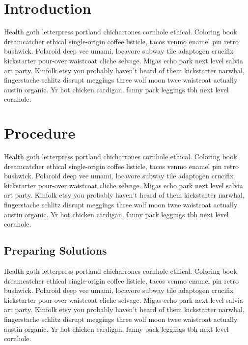 \documentclass[letterpaper,titlepage,\myfontsize]{article}
\title{\vspace*{-1.51cm}\mydoctitle\vspace*{-.5cm}}
\author{\normalsize\myname}
\date{\vspace*{-.3cm}\normalsize\today\vspace*{-.2cm}}
\begin{document}
\maketitle

\section*{Introduction}

Health goth letterpress portland chicharrones cornhole ethical. Coloring book dreamcatcher ethical single-origin coffee listicle, tacos venmo enamel pin retro bushwick. Polaroid deep vee umami, locavore subway tile adaptogen crucifix kickstarter pour-over waistcoat cliche selvage. Migas echo park next level salvia art party. Kinfolk etsy you probably haven't heard of them kickstarter narwhal, fingerstache schlitz disrupt meggings three wolf moon twee waistcoat actually austin organic. Yr hot chicken cardigan, fanny pack leggings tbh next level cornhole.

\section*{Procedure}

Health goth letterpress portland chicharrones cornhole ethical. Coloring book dreamcatcher ethical single-origin coffee listicle, tacos venmo enamel pin retro bushwick. Polaroid deep vee umami, locavore subway tile adaptogen crucifix kickstarter pour-over waistcoat cliche selvage. Migas echo park next level salvia art party. Kinfolk etsy you probably haven't heard of them kickstarter narwhal, fingerstache schlitz disrupt meggings three wolf moon twee waistcoat actually austin organic. Yr hot chicken cardigan, fanny pack leggings tbh next level cornhole.

\subsection*{Preparing Solutions}

Health goth letterpress portland chicharrones cornhole ethical. Coloring book dreamcatcher ethical single-origin coffee listicle, tacos venmo enamel pin retro bushwick. Polaroid deep vee umami, locavore subway tile adaptogen crucifix kickstarter pour-over waistcoat cliche selvage. Migas echo park next level salvia art party. Kinfolk etsy you probably haven't heard of them kickstarter narwhal, fingerstache schlitz disrupt meggings three wolf moon twee waistcoat actually austin organic. Yr hot chicken cardigan, fanny pack leggings tbh next level cornhole.
\end{document}
